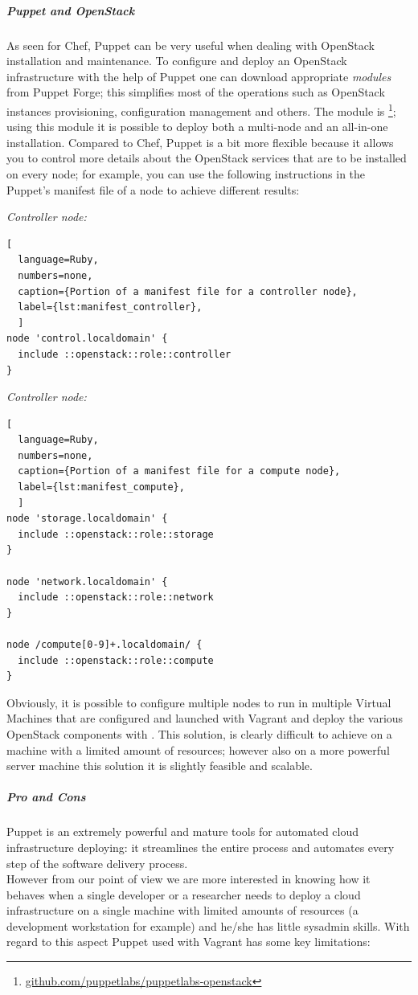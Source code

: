 \subparagraph{Puppet and OpenStack}
\label{subp:sota_puppet_openstack}

As seen for Chef, Puppet can be very useful when dealing with OpenStack installation and maintenance. To configure and deploy an OpenStack infrastructure with the help of Puppet one can download appropriate \textit{modules} from Puppet Forge; this simplifies most of the operations such as OpenStack instances provisioning, configuration management and others.
The module is \footnote{\url{github.com/puppetlabs/puppetlabs-openstack}}; using this module it is possible to deploy both a multi-node and an all-in-one installation. Compared to Chef, Puppet is a bit more flexible because it allows you to control more details about the OpenStack services that are to be installed on every node; for example, you can use the following instructions in the Puppet's manifest file of a node to achieve different results:

\textit{Controller node:}
\begin{lstlisting}[
  language=Ruby,
  numbers=none,
  caption={Portion of a manifest file for a controller node},
  label={lst:manifest_controller},
  ]
node 'control.localdomain' {
  include ::openstack::role::controller
}
\end{lstlisting}

\textit{Controller node:}
\begin{lstlisting}[
  language=Ruby,
  numbers=none,
  caption={Portion of a manifest file for a compute node},
  label={lst:manifest_compute},
  ]
node 'storage.localdomain' {
  include ::openstack::role::storage
}

node 'network.localdomain' {
  include ::openstack::role::network
}

node /compute[0-9]+.localdomain/ {
  include ::openstack::role::compute
}
\end{lstlisting}

Obviously, it is possible to configure multiple nodes to run in multiple Virtual Machines that are configured and launched with Vagrant and deploy the various OpenStack components with . This solution, is clearly difficult to achieve on a machine with a limited amount of resources; however also on a more powerful server machine this solution it is slightly feasible and scalable.

\subparagraph{Pro and Cons}
\label{subp:sota_puppet_pro_cons}
Puppet is an extremely powerful and mature tools for automated cloud infrastructure deploying: it streamlines the entire process and automates every step of the software delivery process.\\
However from our point of view we are more interested in knowing how it behaves when a single developer or a researcher needs to deploy a cloud infrastructure on a single machine with limited amounts of resources (a development workstation for example) and he/she has little sysadmin skills. With regard to this aspect Puppet used with Vagrant has some key limitations:

